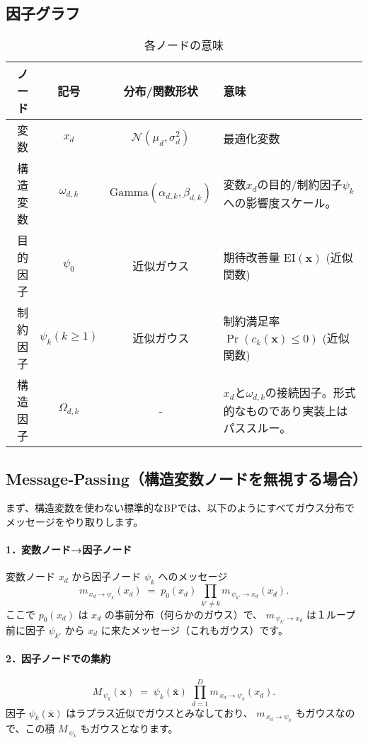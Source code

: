 \documentclass[oneside,onecolumn]{jlreq}
\theoremstyle{plain}
\begin{document}
\subsection{因子グラフ}
\begin{table}
    \centering
    \caption{各ノードの意味}
    \begin{tabular}{rccl}
        \toprule
        ノード & 記号 & 分布/関数形状 & 意味 \\\midrule
        変数 & $x_d$ & $\mathcal{N}(\mu_d, \sigma^2_d)$ & 最適化変数  \\
        構造変数 & $\omega_{d,k}$ & $\mathrm{Gamma}(\alpha_{d,k}, \beta_{d,k})$ & 変数$x_d$の目的/制約因子$\psi_k$ への影響度スケール。 \\
        目的因子 & $\psi_0$ & 近似ガウス & 期待改善量 $\mathrm{EI}(\bm{x})$ (近似関数) \\
        制約因子 & $\psi_k (k\geq 1)$ & 近似ガウス & 制約満足率 $\Pr(c_k(\bm{x})\leq 0)$ (近似関数) \\
        構造因子 & $\Omega_{d,k}$ & - & $x_d$と$\omega_{d,k}$の接続因子。形式的なものであり実装上はパススルー。
        \\\bottomrule
    \end{tabular}
\end{table}

\newpage
\subsection{Message‐Passing（構造変数ノードを無視する場合）}
まず、構造変数を使わない標準的なBPでは、以下のようにすべてガウス分布でメッセージをやり取りします。

\paragraph{1．変数ノード→因子ノード}
変数ノード \(x_d\) から因子ノード \(\psi_k\) へのメッセージ
\[
    m_{\,x_d \to \psi_k}(x_d)
    \;=\;
    p_{0}(x_d)\;\prod_{k'\neq k} m_{\,\psi_{k'}\to x_d}(x_d).
\]
ここで \(p_{0}(x_d)\) は \(x_d\) の事前分布（何らかのガウス）で、
\(m_{\,\psi_{k'}\to x_d}\) は１ループ前に因子 \(\psi_{k'}\) から \(x_d\) に来たメッセージ（これもガウス）です。

\paragraph{2．因子ノードでの集約}
\[
    M_{\,\psi_k}(\mathbf{x})
    \;=\;
    \psi_k(\bar{\mathbf{x}})\;\prod_{d=1}^D m_{\,x_d\to \psi_k}(x_d).
\]
因子 \(\psi_k(\bar{\mathbf{x}})\) はラプラス近似でガウスとみなしており、
\(m_{\,x_d\to \psi_k}\) もガウスなので、この積 \(M_{\,\psi_k}\) もガウスとなります。
\end{document}
